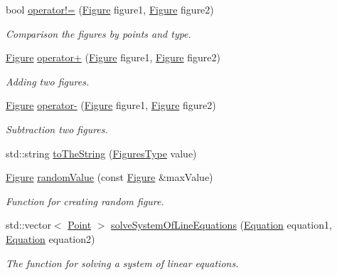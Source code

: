 \begin{DoxyCompactItemize}
bool \mbox{\hyperlink{namespacefop_a386a3d90ae69e900125c0a3ad5c48cdf}{operator!=}} (\mbox{\hyperlink{classfop_1_1_figure}{Figure}} figure1, \mbox{\hyperlink{classfop_1_1_figure}{Figure}} figure2)
\begin{DoxyCompactList}\small\item\em Comparison the figures by points and type. \end{DoxyCompactList}\item 
\mbox{\hyperlink{classfop_1_1_figure}{Figure}} \mbox{\hyperlink{namespacefop_a0cdacf03236287528189a51913750a8c}{operator+}} (\mbox{\hyperlink{classfop_1_1_figure}{Figure}} figure1, \mbox{\hyperlink{classfop_1_1_figure}{Figure}} figure2)
\begin{DoxyCompactList}\small\item\em Adding two figures. \end{DoxyCompactList}\item 
\mbox{\hyperlink{classfop_1_1_figure}{Figure}} \mbox{\hyperlink{namespacefop_ab4ccc3243195b647632a36db88113230}{operator-\/}} (\mbox{\hyperlink{classfop_1_1_figure}{Figure}} figure1, \mbox{\hyperlink{classfop_1_1_figure}{Figure}} figure2)
\begin{DoxyCompactList}\small\item\em Subtraction two figures. \end{DoxyCompactList}\item 
std\+::string \mbox{\hyperlink{namespacefop_a4cb96232c3e9d082f2c48a97a35e2454}{to\+The\+String}} (\mbox{\hyperlink{namespacefop_a60dafe2e1ac5bb402dad57ecacde23d5}{Figures\+Type}} value)
\item 
\mbox{\hyperlink{classfop_1_1_figure}{Figure}} \mbox{\hyperlink{namespacefop_af4426fe719704633a3129439207583ce}{random\+Value}} (const \mbox{\hyperlink{classfop_1_1_figure}{Figure}} \&max\+Value)
\begin{DoxyCompactList}\small\item\em Function for creating random figure. \end{DoxyCompactList}\item 
std\+::vector$<$ \mbox{\hyperlink{structtdp_1_1_point}{Point}} $>$ \mbox{\hyperlink{namespacefop_a231b2b83dca5c216ecd24bea0f918e87}{solve\+System\+Of\+Line\+Equations}} (\mbox{\hyperlink{structfop_1_1_equation}{Equation}} equation1, \mbox{\hyperlink{structfop_1_1_equation}{Equation}} equation2)
\begin{DoxyCompactList}\small\item\em The function for solving a system of linear equations. \end{DoxyCompactList}\item 

\end{DoxyCompactItemize}
